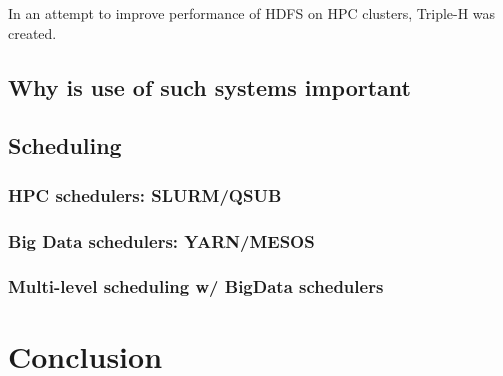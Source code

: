 \documentclass{report}
\begin{document}

	
	
	
    In an attempt to improve performance of HDFS on HPC clusters, Triple-H was
    created.  \section{Why is use of such systems important}
    \section{Scheduling} \subsection{HPC schedulers: SLURM/QSUB} \subsection{Big
    Data schedulers: YARN/MESOS} \subsection{Multi-level scheduling w/ BigData
    schedulers} \chapter{Conclusion}




\end{document}
